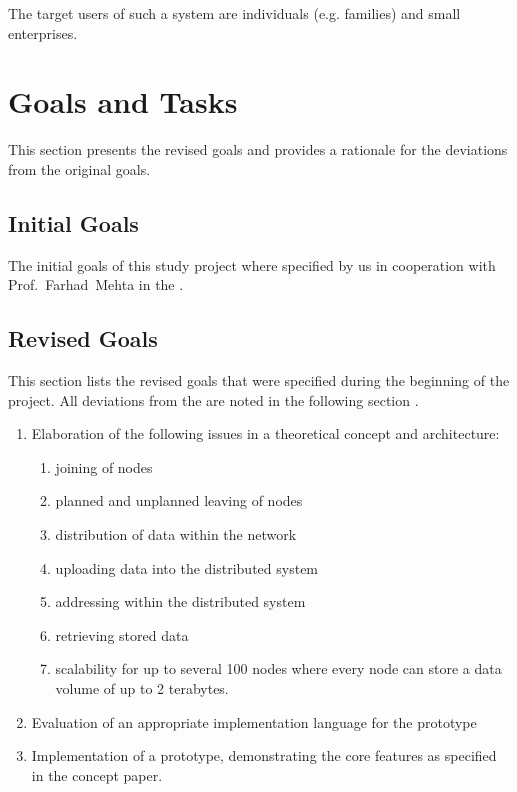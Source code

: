 The target users of such a system are individuals (e.g. families) and small enterprises.

\section{Goals and Tasks}
This section presents the revised goals and provides a rationale for the deviations from the original goals.

\subsection{Initial Goals}
The initial goals of this study project where specified by us in cooperation with Prof.~Farhad~Mehta in the .

\subsection{Revised Goals}
This section lists the revised goals that were specified during the beginning of the project. All deviations from the  are noted in the following section .

\begin{enumerate}
    \item Elaboration of the following issues in a theoretical concept and architecture:
        \begin{enumerate}
            \item joining of nodes
            \item planned and unplanned leaving of nodes
            \item distribution of data within the network
            \item uploading data into the distributed system
            \item addressing within the distributed system
            \item retrieving stored data
            \item scalability for up to several 100 nodes where every node can store a data volume of up to 2 terabytes.
        \end{enumerate}
    \item Evaluation of an appropriate implementation language for the prototype
    \item Implementation of a prototype, demonstrating the core features as specified in the concept paper.
\end{enumerate}

